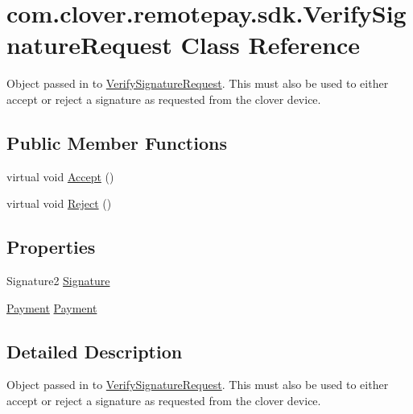 \hypertarget{classcom_1_1clover_1_1remotepay_1_1sdk_1_1_verify_signature_request}{}\section{com.\+clover.\+remotepay.\+sdk.\+Verify\+Signature\+Request Class Reference}
\label{classcom_1_1clover_1_1remotepay_1_1sdk_1_1_verify_signature_request}


Object passed in to \hyperlink{classcom_1_1clover_1_1remotepay_1_1sdk_1_1_verify_signature_request}{Verify\+Signature\+Request}. This must also be used to either accept or reject a signature as requested from the clover device.  


\subsection*{Public Member Functions}
\begin{DoxyCompactItemize}
\item 
virtual void \hyperlink{classcom_1_1clover_1_1remotepay_1_1sdk_1_1_verify_signature_request_a0a77d7ae0fc42ff221e3dfdbc73b551c}{Accept} ()
\item 
virtual void \hyperlink{classcom_1_1clover_1_1remotepay_1_1sdk_1_1_verify_signature_request_a49a692bf6a7c746a19c6e423410ddc87}{Reject} ()
\end{DoxyCompactItemize}
\subsection*{Properties}
\begin{DoxyCompactItemize}
\item 
Signature2 \hyperlink{classcom_1_1clover_1_1remotepay_1_1sdk_1_1_verify_signature_request_a02212d10337e1c0b56f0d06f6018f94d}{Signature}
\item 
\hyperlink{classcom_1_1clover_1_1sdk_1_1v3_1_1payments_1_1_payment}{Payment} \hyperlink{classcom_1_1clover_1_1remotepay_1_1sdk_1_1_verify_signature_request_abc156a7a89199f87181787201f3f2da3}{Payment}
\end{DoxyCompactItemize}


\subsection{Detailed Description}
Object passed in to \hyperlink{classcom_1_1clover_1_1remotepay_1_1sdk_1_1_verify_signature_request}{Verify\+Signature\+Request}. This must also be used to either accept or reject a signature as requested from the clover device. 



